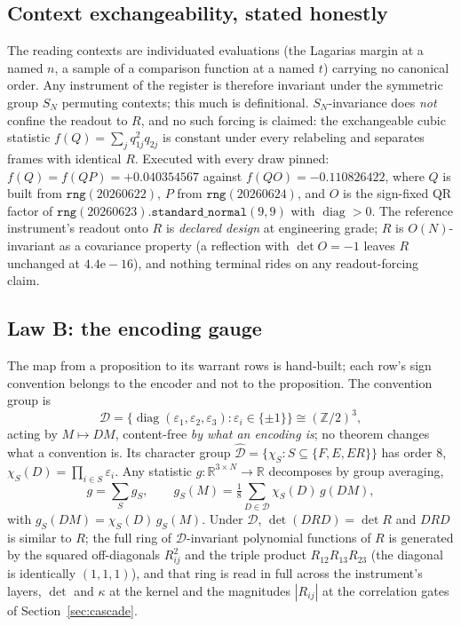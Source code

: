 \documentclass[twocolumn,10pt]{article}
\theoremstyle{plain}
\theoremstyle{definition}
\newcommand{\Rl}{\mathbb{R}}
\begin{document}
\subsection{Context exchangeability, stated honestly}\label{ssec:lawA}
The reading contexts are individuated evaluations (the Lagarias margin at a named $n$, a sample of a comparison function at a named $t$) carrying no canonical order. Any instrument of the register is therefore invariant under the symmetric group $S_N$ permuting contexts; this much is definitional. $S_N$-invariance does \emph{not} confine the readout to $R$, and no such forcing is claimed: the exchangeable cubic statistic $f(Q)=\sum_j q_{1j}^2q_{2j}$ is constant under every relabeling and separates frames with identical $R$. Executed with every draw pinned: $f(Q)=f(QP)=+0.040354567$ against $f(QO)=-0.110826422$, where $Q$ is built from $\texttt{rng}(20260622)$, $P$ from $\texttt{rng}(20260624)$, and $O$ is the sign-fixed QR factor of $\texttt{rng}(20260623).\texttt{standard\_normal}(9,9)$ with $\operatorname{diag}>0$. The reference instrument's readout onto $R$ is \emph{declared design} at engineering grade; $R$ is $O(N)$-invariant as a covariance property (a reflection with $\det O=-1$ leaves $R$ unchanged at $4.4\mathrm{e}{-}16$), and nothing terminal rides on any readout-forcing claim.

\subsection{Law B: the encoding gauge}\label{ssec:lawB}
The map from a proposition to its warrant rows is hand-built; each row's sign convention belongs to the encoder and not to the proposition. The convention group is
\begin{equation}
\mathcal{D}=\{\operatorname{diag}(\varepsilon_1,\varepsilon_2,\varepsilon_3):\varepsilon_i\in\{\pm1\}\}\cong(\mathbb{Z}/2)^3,
\end{equation}
acting by $M\mapsto DM$, content-free \emph{by what an encoding is}; no theorem changes what a convention is. Its character group $\widehat{\mathcal D}=\{\chi_S: S\subseteq\{F,E,ER\}\}$ has order $8$, $\chi_S(D)=\prod_{i\in S}\varepsilon_i$. Any statistic $g:\Rl^{3\times N}\to\Rl$ decomposes by group averaging,
\begin{equation}\label{eq:parity}
g=\sum_{S}g_S,\qquad g_S(M)=\tfrac18\sum_{D\in\mathcal D}\chi_S(D)\,g(DM),
\end{equation}
with $g_S(DM)=\chi_S(D)\,g_S(M)$. Under $\mathcal D$, $\det(DRD)=\det R$ and $DRD$ is similar to $R$; the full ring of $\mathcal D$-invariant polynomial functions of $R$ is generated by the squared off-diagonals $R_{ij}^2$ and the triple product $R_{12}R_{13}R_{23}$ (the diagonal is identically $(1,1,1)$), and that ring is read in full across the instrument's layers, $\det$ and $\kappa$ at the kernel and the magnitudes $|R_{ij}|$ at the correlation gates of Section~\ref{sec:cascade}.
\end{document}
